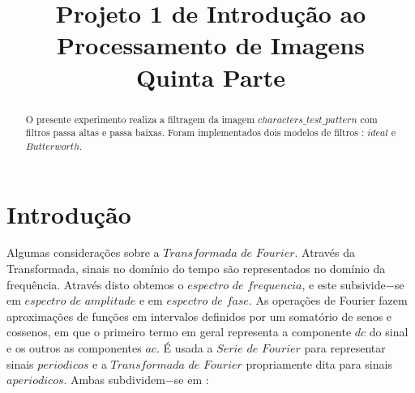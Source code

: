 \documentclass[conference]{IEEEtran}
\begin{document}
\title{Projeto 1 de Introdu\c{c}\~ao ao Processamento de Imagens \\ Quinta Parte}
\author{
}
\maketitle
\begin{abstract}
O presente experimento realiza a filtragem da imagem $characters\_test\_pattern$ com filtros passa altas e passa baixas. Foram implementados dois modelos de filtros : $ideal $ e $Butterworth$.  
\end{abstract}

\section{ Introdu\c{c}\~ao} 
\label{sec:meth} 
Algumas considera\c{c}\~oes sobre a $Transformada$ $de$ $Fourier$. Atrav\'es da Transformada, sinais no dom\'inio do tempo s\~ao representados no dom\'inio da frequ\^encia. Atrav\'es disto obtemos o $espectro$ $de$ $frequencia$, e este subsivide$-$se em $espectro$ $de$ $amplitude$ e em  $espectro$ $de$ $fase$. As opera\c{c}\~oes de Fourier fazem aproxima\c{c}\~oes de fun\c{c}\~oes em intervalos definidos por um somat\'orio de senos e cossenos, em que o primeiro termo em geral representa a componente $dc$ do sinal e os outros as componentes $ac$.  \'E usada a $Serie$ $de$ $Fourier$ para representar sinais $periodicos$ e a $Transformada$ $de$ $Fourier$ propriamente dita para sinais $aperiodicos$. Ambas subdividem$-$se em :
\end{document}
